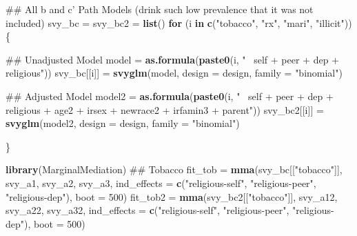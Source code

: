 \documentclass[]{article}
\newenvironment{Shaded}{\begin{snugshade}}{\end{snugshade}}
\newcommand{\KeywordTok}[1]{\textcolor[rgb]{0.13,0.29,0.53}{\textbf{#1}}}
\newcommand{\DataTypeTok}[1]{\textcolor[rgb]{0.13,0.29,0.53}{#1}}
\newcommand{\DecValTok}[1]{\textcolor[rgb]{0.00,0.00,0.81}{#1}}
\newcommand{\StringTok}[1]{\textcolor[rgb]{0.31,0.60,0.02}{#1}}
\newcommand{\ControlFlowTok}[1]{\textcolor[rgb]{0.13,0.29,0.53}{\textbf{#1}}}
\newcommand{\NormalTok}[1]{#1}
\begin{document}
\begin{Shaded}
\begin{Highlighting}[]
\NormalTok{## All b and c' Path Models (drink such low prevalence that it was not included)}
\NormalTok{svy_bc =}\StringTok{ }\NormalTok{svy_bc2 =}\StringTok{ }\KeywordTok{list}\NormalTok{()}
\ControlFlowTok{for}\NormalTok{ (i }\ControlFlowTok{in} \KeywordTok{c}\NormalTok{(}\StringTok{"tobacco"}\NormalTok{, }\StringTok{"rx"}\NormalTok{, }\StringTok{"mari"}\NormalTok{, }\StringTok{"illicit"}\NormalTok{))\{}
  
\NormalTok{  ## Unadjusted Model}
\NormalTok{  model =}\StringTok{ }\KeywordTok{as.formula}\NormalTok{(}\KeywordTok{paste0}\NormalTok{(i, }\StringTok{"~ self + peer + dep + religious"}\NormalTok{))}
\NormalTok{  svy_bc[[i]] =}\StringTok{ }\KeywordTok{svyglm}\NormalTok{(model, }\DataTypeTok{design =}\NormalTok{ design, }\DataTypeTok{family =} \StringTok{"binomial"}\NormalTok{)}
  
\NormalTok{  ## Adjusted Model}
\NormalTok{  model2 =}\StringTok{ }\KeywordTok{as.formula}\NormalTok{(}\KeywordTok{paste0}\NormalTok{(i, }\StringTok{"~ self + peer + dep + religious + age2 + }
\StringTok{                             irsex + newrace2 + irfamin3 + parent"}\NormalTok{))}
\NormalTok{  svy_bc2[[i]] =}\StringTok{ }\KeywordTok{svyglm}\NormalTok{(model2, }\DataTypeTok{design =}\NormalTok{ design, }\DataTypeTok{family =} \StringTok{"binomial"}\NormalTok{)}
  
\NormalTok{\}}

\KeywordTok{library}\NormalTok{(MarginalMediation)}
\NormalTok{## Tobacco}
\NormalTok{fit_tob =}\StringTok{ }\KeywordTok{mma}\NormalTok{(svy_bc[[}\StringTok{"tobacco"}\NormalTok{]],}
\NormalTok{              svy_a1,}
\NormalTok{              svy_a2,}
\NormalTok{              svy_a3,}
              \DataTypeTok{ind_effects =} \KeywordTok{c}\NormalTok{(}\StringTok{"religious-self"}\NormalTok{,}
                              \StringTok{"religious-peer"}\NormalTok{,}
                              \StringTok{"religious-dep"}\NormalTok{),}
              \DataTypeTok{boot =} \DecValTok{500}\NormalTok{)}
\NormalTok{fit_tob2 =}\StringTok{ }\KeywordTok{mma}\NormalTok{(svy_bc2[[}\StringTok{"tobacco"}\NormalTok{]],}
\NormalTok{               svy_a12,}
\NormalTok{               svy_a22,}
\NormalTok{               svy_a32,}
               \DataTypeTok{ind_effects =} \KeywordTok{c}\NormalTok{(}\StringTok{"religious-self"}\NormalTok{,}
                               \StringTok{"religious-peer"}\NormalTok{,}
                               \StringTok{"religious-dep"}\NormalTok{),}
               \DataTypeTok{boot =} \DecValTok{500}\NormalTok{)}


\end{Highlighting}
\end{Shaded}
\end{document}
